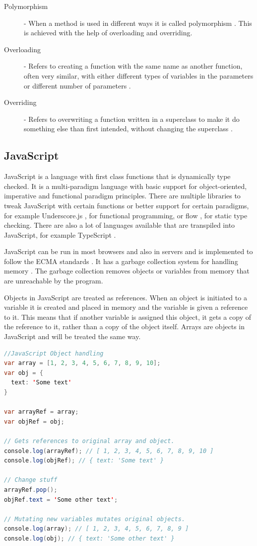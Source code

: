 \documentclass {article}
\begin{document}
\begin{description}
\item [Polymorphism] - When a method is used in different ways it is called polymorphism \cite{gabmar, skansholm}. This is achieved with the help of overloading and overriding.

\item[Overloading] - Refers to creating a function with the same name as another function, often very similar, with either different types of variables in the parameters or different number of parameters \cite{skansholm}.

\item[Overriding] - Refers to overwriting a function written in a superclass to make it do something else than first intended, without changing the superclass \cite{skansholm}.
\end{description}
\subsection{JavaScript}
\label{sec:javascript}
JavaScript is a language with first class functions that is dynamically type checked. It is a multi-paradigm language with basic support for object-oriented, imperative and functional paradigm principles. There are multiple libraries to tweak JavaScript with certain functions or better support for certain paradigms, for example Underscore.js \cite{underscorejs}, for functional programming, or flow \cite{flow}, for static type checking. There are also a lot of languages available that are transpiled into JavaScript, for example TypeScript \cite{typescript}. 

JavaScript can be run in most browsers and also in servers and is implemented to follow the ECMA standards \cite{ecma6table}. It has a garbage collection system for handling memory \cite{mozillamem}. The garbage collection removes objects or variables from memory that are unreachable by the program. 

Objects in JavaScript are treated as references. When an object is initiated to a variable it is created and placed in memory and the variable is given a reference to it. This means that if another variable is assigned this object, it gets a copy of the reference to it, rather than a copy of the object itself. Arrays are objects in JavaScript and will be treated the same way.

\begin{lstlisting}[language=Java, breaklines=true]
//JavaScript Object handling
var array = [1, 2, 3, 4, 5, 6, 7, 8, 9, 10];
var obj = {
  text: 'Some text'
}

var arrayRef = array;
var objRef = obj;

// Gets references to original array and object.
console.log(arrayRef); // [ 1, 2, 3, 4, 5, 6, 7, 8, 9, 10 ]
console.log(objRef); // { text: 'Some text' }

// Change stuff
arrayRef.pop();
objRef.text = 'Some other text';

// Mutating new variables mutates original objects.
console.log(array); // [ 1, 2, 3, 4, 5, 6, 7, 8, 9 ]
console.log(obj); // { text: 'Some other text' }
\end{lstlisting}
\end{document}
